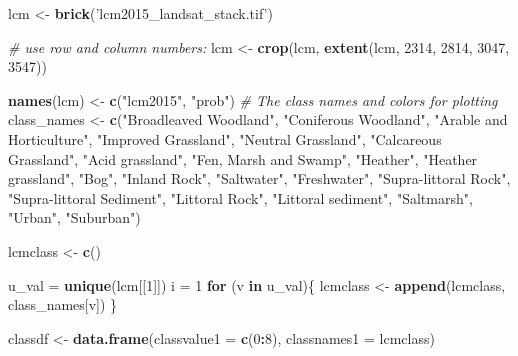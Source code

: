 \documentclass[]{article}
\newenvironment{Shaded}{\begin{snugshade}}{\end{snugshade}}
\newcommand{\CommentTok}[1]{\textcolor[rgb]{0.56,0.35,0.01}{\textit{#1}}}
\newcommand{\ControlFlowTok}[1]{\textcolor[rgb]{0.13,0.29,0.53}{\textbf{#1}}}
\newcommand{\DataTypeTok}[1]{\textcolor[rgb]{0.13,0.29,0.53}{#1}}
\newcommand{\DecValTok}[1]{\textcolor[rgb]{0.00,0.00,0.81}{#1}}
\newcommand{\KeywordTok}[1]{\textcolor[rgb]{0.13,0.29,0.53}{\textbf{#1}}}
\newcommand{\NormalTok}[1]{#1}
\newcommand{\OperatorTok}[1]{\textcolor[rgb]{0.81,0.36,0.00}{\textbf{#1}}}
\newcommand{\StringTok}[1]{\textcolor[rgb]{0.31,0.60,0.02}{#1}}
\begin{document}
\begin{Shaded}
\begin{Highlighting}[]
\NormalTok{lcm <-}\StringTok{ }\KeywordTok{brick}\NormalTok{(}\StringTok{'lcm2015_landsat_stack.tif'}\NormalTok{) }

\CommentTok{# use row and column numbers:}
\NormalTok{lcm <-}\StringTok{ }\KeywordTok{crop}\NormalTok{(lcm, }\KeywordTok{extent}\NormalTok{(lcm, }\DecValTok{2314}\NormalTok{, }\DecValTok{2814}\NormalTok{, }\DecValTok{3047}\NormalTok{, }\DecValTok{3547}\NormalTok{))}


\KeywordTok{names}\NormalTok{(lcm) <-}\StringTok{ }\KeywordTok{c}\NormalTok{(}\StringTok{"lcm2015"}\NormalTok{, }\StringTok{"prob"}\NormalTok{)}
\CommentTok{# The class names and colors for plotting}
\NormalTok{class_names <-}\StringTok{ }\KeywordTok{c}\NormalTok{(}\StringTok{"Broadleaved Woodland"}\NormalTok{, }\StringTok{"Coniferous Woodland"}\NormalTok{, }\StringTok{"Arable and Horticulture"}\NormalTok{, }\StringTok{"Improved Grassland"}\NormalTok{, }\StringTok{"Neutral Grassland"}\NormalTok{, }\StringTok{"Calcareous Grassland"}\NormalTok{, }\StringTok{"Acid grassland"}\NormalTok{, }\StringTok{"Fen, Marsh and Swamp"}\NormalTok{, }\StringTok{"Heather"}\NormalTok{, }\StringTok{"Heather grassland"}\NormalTok{, }\StringTok{"Bog"}\NormalTok{, }\StringTok{"Inland Rock"}\NormalTok{, }\StringTok{"Saltwater"}\NormalTok{, }\StringTok{"Freshwater"}\NormalTok{, }\StringTok{"Supra-littoral Rock"}\NormalTok{, }\StringTok{"Supra-littoral Sediment"}\NormalTok{, }\StringTok{"Littoral Rock"}\NormalTok{, }\StringTok{"Littoral sediment"}\NormalTok{, }\StringTok{"Saltmarsh"}\NormalTok{, }\StringTok{"Urban"}\NormalTok{, }\StringTok{"Suburban"}\NormalTok{)}

\NormalTok{lcmclass <-}\StringTok{ }\KeywordTok{c}\NormalTok{()}

\NormalTok{u_val =}\StringTok{ }\KeywordTok{unique}\NormalTok{(lcm[[}\DecValTok{1}\NormalTok{]])}
\NormalTok{i =}\StringTok{ }\DecValTok{1}
\ControlFlowTok{for}\NormalTok{ (v }\ControlFlowTok{in}\NormalTok{ u_val)\{}
\NormalTok{  lcmclass <-}\StringTok{ }\KeywordTok{append}\NormalTok{(lcmclass, class_names[v])}
\NormalTok{\}}


\NormalTok{classdf <-}\StringTok{ }\KeywordTok{data.frame}\NormalTok{(}\DataTypeTok{classvalue1 =} \KeywordTok{c}\NormalTok{(}\DecValTok{0}\OperatorTok{:}\DecValTok{8}\NormalTok{), }\DataTypeTok{classnames1 =}\NormalTok{ lcmclass)}
\end{Highlighting}
\end{Shaded}
\end{document}
